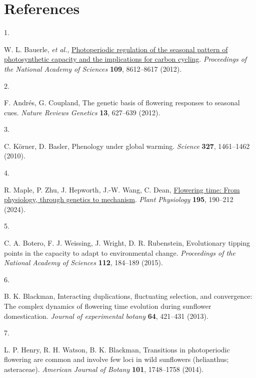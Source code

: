 \documentclass[
  9pt,
  twocolumn,
  twoside]{pnas-new}
\newlength{\cslhangindent}
\newlength{\csllabelwidth}
\newenvironment{CSLReferences}[2] %
 {\begin{list}{}{%
  \setlength{\itemindent}{0pt}
  \setlength{\leftmargin}{0pt}
  \setlength{\parsep}{0pt}
  \ifodd #1
   \setlength{\leftmargin}{\cslhangindent}
   \setlength{\itemindent}{-1\cslhangindent}
  \fi
  \setlength{\itemsep}{#2\baselineskip}}}
 {\end{list}}
\newcommand{\CSLLeftMargin}[1]{\parbox[t]{\csllabelwidth}{\strut#1\strut}}
\newcommand{\CSLRightInline}[1]{\parbox[t]{\linewidth - \csllabelwidth}{\strut#1\strut}}
\begin{document}
\section{References}\label{references}

\bibsplit[2]

\label{refs}
\begin{CSLReferences}{0}{1}
\CSLLeftMargin{1. }%
\CSLRightInline{W. L. Bauerle, \emph{et al.},
\href{https://doi.org/10.1073/pnas.1119131109}{Photoperiodic regulation
of the seasonal pattern of photosynthetic capacity and the implications
for carbon cycling}. \emph{Proceedings of the National Academy of
Sciences} \textbf{109}, 8612--8617 (2012).}

\CSLLeftMargin{2. }%
\CSLRightInline{F. Andrés, G. Coupland, The genetic basis of flowering
responses to seasonal cues. \emph{Nature Reviews Genetics} \textbf{13},
627--639 (2012).}

\CSLLeftMargin{3. }%
\CSLRightInline{C. Körner, D. Basler, Phenology under global warming.
\emph{Science} \textbf{327}, 1461--1462 (2010).}

\CSLLeftMargin{4. }%
\CSLRightInline{R. Maple, P. Zhu, J. Hepworth, J.-W. Wang, C. Dean,
\href{https://doi.org/10.1093/plphys/kiae109}{Flowering time: From
physiology, through genetics to mechanism}. \emph{Plant Physiology}
\textbf{195}, 190--212 (2024).}

\CSLLeftMargin{5. }%
\CSLRightInline{C. A. Botero, F. J. Weissing, J. Wright, D. R.
Rubenstein, Evolutionary tipping points in the capacity to adapt to
environmental change. \emph{Proceedings of the National Academy of
Sciences} \textbf{112}, 184--189 (2015).}

\CSLLeftMargin{6. }%
\CSLRightInline{B. K. Blackman, Interacting duplications, fluctuating
selection, and convergence: The complex dynamics of flowering time
evolution during sunflower domestication. \emph{Journal of experimental
botany} \textbf{64}, 421--431 (2013).}

\CSLLeftMargin{7. }%
\CSLRightInline{L. P. Henry, R. H. Watson, B. K. Blackman, Transitions
in photoperiodic flowering are common and involve few loci in wild
sunflowers (helianthus; asteraceae). \emph{American Journal of Botany}
\textbf{101}, 1748--1758 (2014).}


\end{CSLReferences}
\end{document}
